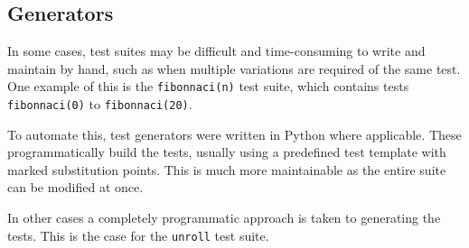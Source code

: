 \subsection{Generators}

In some cases, test suites may be difficult and time-consuming to write and maintain by hand, such as when multiple variations are required of the same test. One example of this is the \texttt{fibonnaci(n)} test suite, which contains tests \texttt{fibonnaci(0)} to \texttt{fibonnaci(20)}.

To automate this, test generators were written in Python where applicable. These programmatically build the tests, usually using a predefined test template with marked substitution points. This is much more maintainable as the entire suite can be modified at once.

In other cases a completely programmatic approach is taken to generating the tests. This is the case for the \texttt{unroll} test suite.